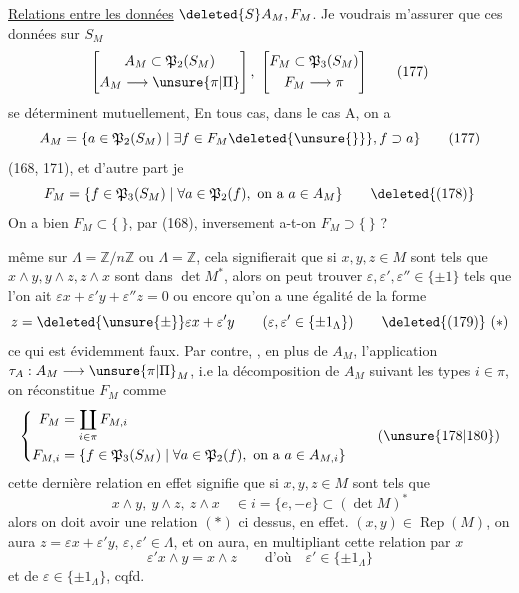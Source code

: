 \uline{Relations entre les données} $\deleted{S}A_M,F_M$. Je voudrais m'assurer que ces données sur $S_M$
\[
 \left[\begin{gathered}A_M\subset\mathfrak P_2(S_M)\\A_M\longrightarrow\unsure{\pi|\Pi}\end{gathered}\right],\
 \left[\begin{gathered}F_M\subset\mathfrak P_3(S_M)\\F_M\longrightarrow\pi\end{gathered}\right]\tag*{(177)}
\]
se déterminent mutuellement, En tous cas, dans le cas A\deleted{\unsure{B)} $(2.1_\Lambda\ne0)$}\inserted{comme B}, on a
\[
 A_M=\{a\in\mathfrak P_2(S_M)\mid\exists f\in F_M\deleted{\unsure{\}}},f\supset a\}\tag*{(177)}
\]
(168,  171), et d'autre part je   
\[
 F_M=\{f\in\mathfrak P_3(S_M)\mid\forall a\in\mathfrak P_2(f),\text{ on a }a\in A_M\}\tag*{\deleted{(178)}}
\]
On a bien $F_M\subset\{\ \}$, par (168), inversement  a-t-on $F_M\supset\{\ \}$ ?

 même sur $\Lambda=\mathbb Z/n\mathbb Z$ ou $\Lambda=\mathbb Z$, cela signifierait que si $x,y,z\in M$ sont tels que $x\wedge y,y\wedge z,z\wedge x$ sont dans $\det M^*$, alors on peut  trouver
$\varepsilon,\varepsilon',\varepsilon''\in\{\pm1\}$ tels que l'on ait $\varepsilon x+\varepsilon'y+\varepsilon''z=0$ ou encore qu'on a une égalité de la forme
\[
 z=\deleted{\unsure{\pm}}\varepsilon x+\varepsilon'y\qquad(\varepsilon,\varepsilon'\in\{\pm1_\Lambda\})\tag*{\deleted{(179)} $(*)$}
\]
ce qui est évidemment faux. Par contre,  , en plus de $A_M$, l'application $\tau_A:A_M\longrightarrow\unsure{\pi|\Pi}_M$, i.e la décomposition de $A_M$ suivant les types $i\in\pi$, on réconstitue $F_M$ comme
\[
 \left\{\begin{aligned}
 F_M&=\coprod_{i\in\pi}F_{M,i}\\
 F_{M,i}&=\{f\in\mathfrak P_3(S_M)\mid\forall a\in\mathfrak P_2(f),\text{ on a }a\in A_{M,i}\}
 \end{aligned}\right.\tag*{(\unsure{178|180})}
\]
cette dernière relation en effet signifie que si $x,y,z\in M$ sont tels que
\[
 x\wedge y,\ y\wedge z,\ z\wedge x\quad\in i=\{e,-e\}\subset(\det M)^*
\]
alors on doit avoir une relation $(*)$ ci dessus, en effet.  $(x,y)\in\operatorname{Rep}(M)$, on aura $z=\varepsilon x+\varepsilon'y$,  $\varepsilon,\varepsilon'\in\Lambda$, et on aura, en multipliant cette relation par $x$
\[
 \varepsilon'x\wedge y=x\wedge z\qquad\text{d'où}\quad \varepsilon'\in\{\pm1_\Lambda\}
\]
et de  $\varepsilon\in\{\pm1_\Lambda\}$, cqfd.

